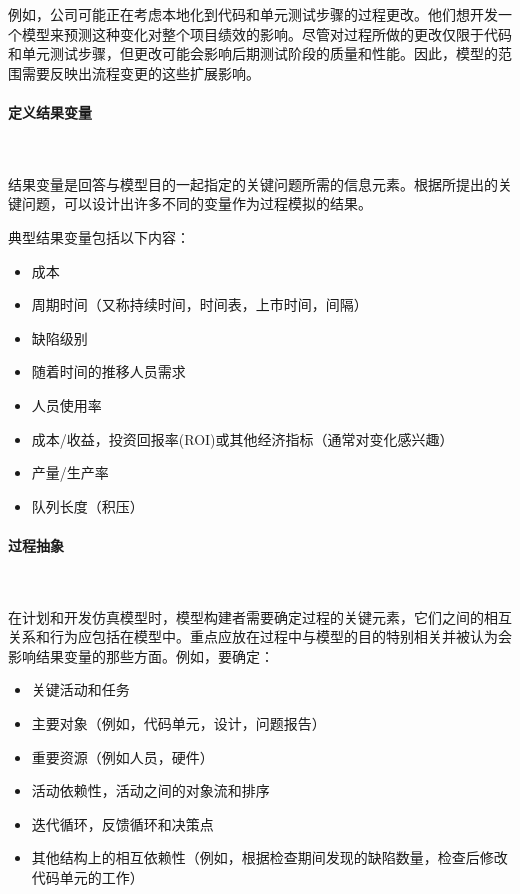 例如，公司可能正在考虑本地化到代码和单元测试步骤的过程更改。他们想开发一个模型来预测这种变化对整个项目绩效的影响。尽管对过程所做的更改仅限于代码和单元测试步骤，但更改可能会影响后期测试阶段的质量和性能。因此，模型的范围需要反映出流程变更的这些扩展影响。

\paragraph*{定义结果变量}~{} \par
结果变量是回答与模型目的一起指定的关键问题所需的信息元素。根据所提出的关键问题，可以设计出许多不同的变量作为过程模拟的结果。

典型结果变量包括以下内容：
\vspace{-0.8em}
\begin{multicols}{2}
    \begin{itemize}
        \item 成本
        \item 周期时间（又称持续时间，时间表，上市时间，间隔）
        \item 缺陷级别
        \item 随着时间的推移人员需求
        \item 人员使用率
        \item 成本/收益，投资回报率(ROI)或其他经济指标（通常对变化感兴趣）
        \item 产量/生产率
        \item 队列长度（积压）
    \end{itemize}
\end{multicols}
\vspace{-1em}

\paragraph*{过程抽象}~{} \par
在计划和开发仿真模型时，模型构建者需要确定过程的关键元素，它们之间的相互关系和行为应包括在模型中。重点应放在过程中与模型的目的特别相关并被认为会影响结果变量的那些方面。例如，要确定：
\vspace{-0.8em}
\begin{multicols}{2}
    \begin{itemize}
        \item 关键活动和任务
        \item 主要对象（例如，代码单元，设计，问题报告）
        \item 重要资源（例如人员，硬件）
        \item 活动依赖性，活动之间的对象流和排序
        \item 迭代循环，反馈循环和决策点
        \item 其他结构上的相互依赖性（例如，根据检查期间发现的缺陷数量，检查后修改 代码单元的工作）
    \end{itemize}
\end{multicols}
\vspace{-1em}

